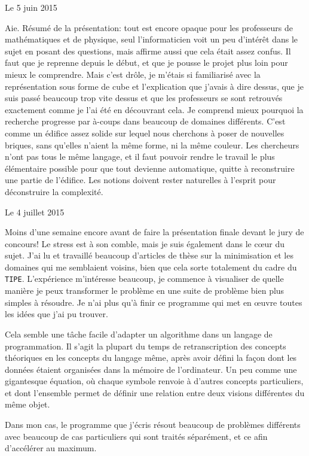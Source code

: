 \documentclass[12pt,final]{report} %
\newcommand{\datemarge}[1]{%
   \newpage
   
        {\hfill{\color{blue}#1}}

}
\newcommand{\majuscule}[1]{{\large \texttt{#1}}}
\begin{document}
\begin{cursive}
{\datemarge{Le 5 juin 2015}

Aie. Résumé de la présentation: tout est encore opaque pour les professeurs de mathématiques et de physique, seul l'informaticien voit un peu d'intérêt dans le sujet en posant des questions, mais affirme aussi que cela était assez confus. 
Il faut que je reprenne depuis le début, et que je pousse le projet plus loin pour mieux le comprendre.
Mais c'est drôle, je m'étais si familiarisé avec la représentation sous forme de cube et l'explication que j'avais à dire dessus, que je suis passé beaucoup trop vite dessus et que les professeurs se sont retrouvés exactement comme je l'ai été en découvrant cela.
Je comprend mieux pourquoi la recherche progresse par à-coups dans beaucoup de domaines différents. 
C'est comme un édifice assez solide sur lequel nous cherchons à poser de nouvelles briques, sans qu'elles n'aient la même forme, ni la même couleur. 
Les chercheurs n'ont pas tous le même langage, et il faut pouvoir rendre le travail le plus élémentaire possible pour que tout devienne automatique, quitte à reconstruire une partie de l'édifice.
Les notions doivent rester naturelles à l'esprit pour déconstruire la complexité.




\datemarge{Le 4 juillet 2015}

Moins d'une semaine encore avant de faire la présentation finale devant le jury de concours!
Le stress est à son comble, mais je suis également dans le c\oe{}ur du sujet.
J'ai lu et travaillé beaucoup d'articles de thèse sur la minimisation et les domaines qui me semblaient voisins, bien que cela sorte totalement du cadre du \majuscule{TIPE}.
L'expérience m'intéresse beaucoup, je commence à visualiser de quelle manière je peux transformer le problème en une suite de problème bien plus simples à résoudre.
Je n'ai plus qu'à finir ce programme qui met en \oe{}uvre toutes les idées que j'ai pu trouver. 

Cela semble une tâche facile d'adapter un algorithme dans un langage de programmation.
Il s'agit la plupart du temps de retranscription des concepts théoriques en les concepts du langage même, après avoir défini la façon dont les données étaient organisées dans la mémoire de l'ordinateur.
Un peu comme une gigantesque équation, où chaque symbole renvoie à d'autres concepts particuliers, et dont l'ensemble permet de définir une relation entre deux visions différentes du même objet.

Dans mon cas, le programme que j'écris résout beaucoup de problèmes différents avec beaucoup de cas particuliers qui sont traités séparément, et ce afin d'accélérer au maximum.



}
\end{cursive}
\end{document}
